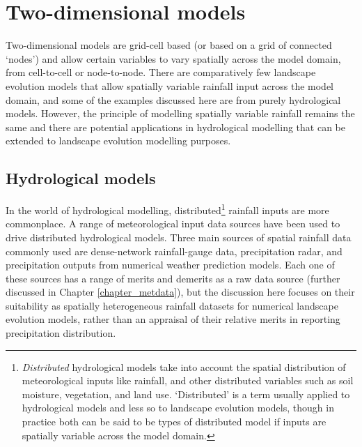 
\section{Two-dimensional models}
Two-dimensional models are grid-cell based (or based on a grid of connected `nodes') and allow certain variables to vary spatially across the model domain, from cell-to-cell or node-to-node. There are comparatively few landscape evolution models that allow spatially variable rainfall input across the model domain, and some of the examples discussed here are from purely hydrological models. However, the principle of modelling spatially variable rainfall remains the same and there are potential applications in hydrological modelling that can be extended to landscape evolution modelling purposes. 

\subsection{Hydrological models}
In the world of hydrological modelling, distributed\footnote{\textit{Distributed} hydrological models take into account the spatial distribution of meteorological inputs like rainfall, and other distributed variables such as soil moisture, vegetation, and land use. `Distributed' is a term usually applied to hydrological models and less so to landscape evolution models, though in practice both can be said to be types of distributed model if inputs are spatially variable across the model domain.} rainfall inputs are more commonplace. A range of meteorological input data sources have been used to drive distributed hydrological models. Three main sources of spatial rainfall data commonly used are dense-network rainfall-gauge data, precipitation radar, and precipitation outputs from numerical weather prediction models. Each one of these sources has a range of merits and demerits as a raw data source (further discussed in Chapter \ref{chapter_metdata}), but the discussion here focuses on their suitability as spatially heterogeneous rainfall datasets for numerical landscape evolution models, rather than an appraisal of their relative merits in reporting precipitation distribution.

